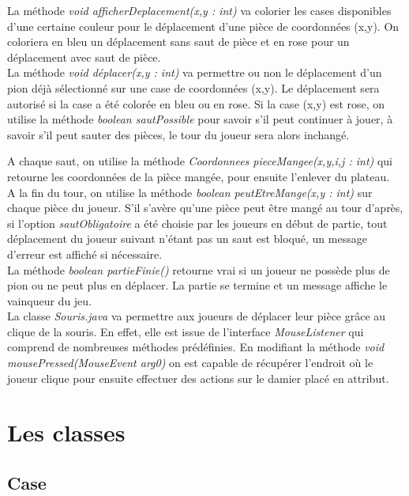 \documentclass[12,french]{report}
\begin{document}
La méthode \textit{void afficherDeplacement(x,y : int)} va colorier les cases disponibles d'une certaine couleur pour le déplacement d'une pièce de coordonnées (x,y). On coloriera en bleu un déplacement sans saut de pièce et en rose pour un déplacement avec saut de pièce.\\

La méthode \textit{void déplacer(x,y : int)} va permettre ou non le déplacement d'un pion déjà sélectionné sur une case de coordonnées (x,y). Le déplacement sera autorisé si la case a été colorée en bleu ou en rose. Si la case (x,y) est rose, on utilise la méthode \textit{boolean sautPossible} pour savoir s'il peut continuer à jouer, à savoir s'il peut sauter des pièces, le tour du joueur sera alors inchangé.

A chaque saut, on utilise la méthode \textit{Coordonnees pieceMangee(x,y,i,j : int)} qui retourne les coordonnées de la pièce mangée, pour ensuite l'enlever du plateau.\\

A la fin du tour, on utilise la méthode \textit{boolean peutEtreMange(x,y : int)} sur chaque pièce du joueur. S'il s'avère qu'une pièce peut être mangé au tour d'après, si l'option \textit{sautObligatoire} a été choisie par les joueurs en début de partie, tout déplacement du joueur suivant n'étant pas un saut est bloqué, un message d'erreur est affiché si nécessaire.\\

La méthode \textit{boolean partieFinie()} retourne vrai si un joueur ne possède plus de pion ou ne peut plus en déplacer. La partie se termine et un message affiche le vainqueur du jeu.\\

La classe \textit{Souris.java} va permettre aux joueurs de déplacer leur pièce grâce au clique de la souris. En effet, elle est issue de l'interface \textit{MouseListener} qui comprend de nombreuses méthodes prédéfinies. En modifiant la méthode \textit{void mousePressed(MouseEvent arg0)} on est capable de récupérer l'endroit où le joueur clique pour ensuite effectuer des actions sur le damier placé en attribut.


\chapter{Les classes}

\section{Case}
\end{document}
